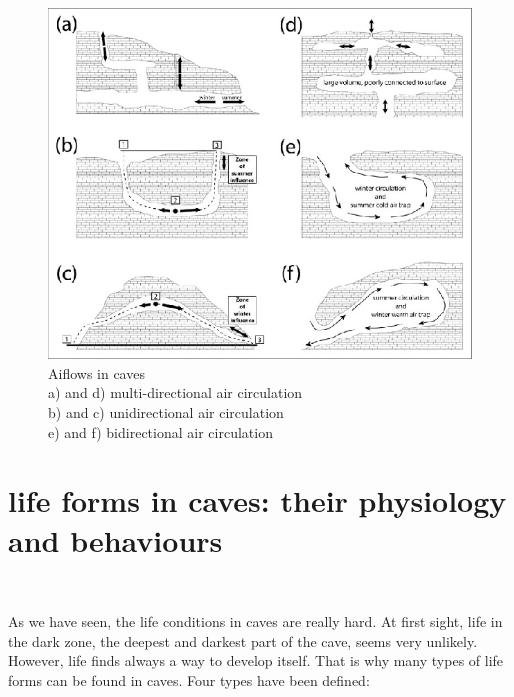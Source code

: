 \documentclass[draft, final]{report}
\begin{document}
\begin{figure}[!ht]
  \centering
  \includegraphics[scale=1.5]{LateX/Images/IllustrationsofmechanismsforcaveairflowForthermallydrivenflowsairflow.png}
  \caption{Aiflows in caves
    \\ a) and d) multi-directional air circulation
    \\ b) and c) unidirectional air circulation
    \\ e) and f) bidirectional air circulation \cite{caveaircirculation}\label{Airflows}}

\end{figure}

\clearpage

\chapter{life forms in caves: their physiology and behaviours}
~\par
As we have seen, the life conditions in caves are really hard. At first sight, life in the dark zone, the deepest and darkest part of the cave, seems very unlikely. However, life finds
always a way to develop itself. That is why many types of life forms can be found in caves. Four types have been defined:
\end{document}
